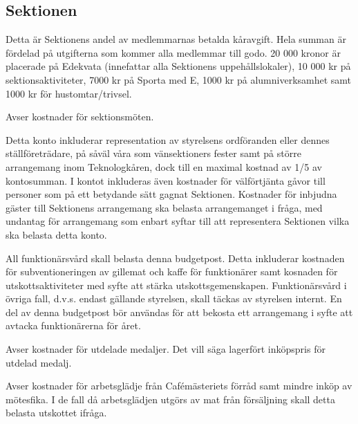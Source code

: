 \documentclass[../_main/handlingar.tex]{subfiles}
\begin{document}
\subsection*{Sektionen}
\titlerule[0.5pt]
\begin{description}[style=multiline, leftmargin=60mm]

\item[SEK01, Sektionsavgifter]
Detta är Sektionens andel av medlemmarnas betalda kåravgift. Hela summan är fördelad på utgifterna som kommer alla medlemmar till godo. 20 000 kronor är placerade på Edekvata (innefattar alla Sektionens uppehållslokaler), 10 000 kr på sektionsaktiviteter, 7000 kr på Sporta med E, 1000 kr på alumniverksamhet samt 1000 kr för hustomtar/trivsel.

\item[SEK01, Sektionsaktiviteter]
Avser kostnader för sektionsmöten.

\item[SEK01, Representation]
Detta konto inkluderar representation av styrelsens ordföranden eller dennes ställföreträdare, på såväl våra som vänsektioners fester samt på större arrangemang inom Teknologkåren, dock till en maximal kostnad av 1/5 av kontosumman. I kontot inkluderas även kostnader för välförtjänta gåvor till personer som på ett betydande sätt gagnat Sektionen. Kostnader för inbjudna gäster till Sektionens arrangemang ska belasta arrangemanget i fråga, med undantag för arrangemang som enbart syftar till att representera Sektionen vilka ska belasta detta konto.

\item[SEK01, Funktionärsvård]
All funktionärsvård skall belasta denna budgetpost. Detta inkluderar kostnaden för subventioneringen av gillemat och kaffe för funktionärer samt kosnaden för utskottsaktiviteter med syfte att stärka utskottsgemenskapen. Funktionärsvård i övriga fall, d.v.s. endast gällande styrelsen, skall täckas av styrelsen internt. En del av denna budgetpost bör användas för att bekosta ett arrangemang i syfte att avtacka funktionärerna för året.

\item[SEK01, Medaljer]
Avser kostnader för utdelade medaljer. Det vill säga lagerfört inköpspris för utdelad medalj.

\item[SEK01, Arbetsglädje]
Avser kostnader för arbetsglädje från Cafémästeriets förråd samt mindre inköp av mötesfika. I de fall då arbetsglädjen utgörs av mat från försäljning skall detta belasta utskottet ifråga.


\end{description}
\end{document}
